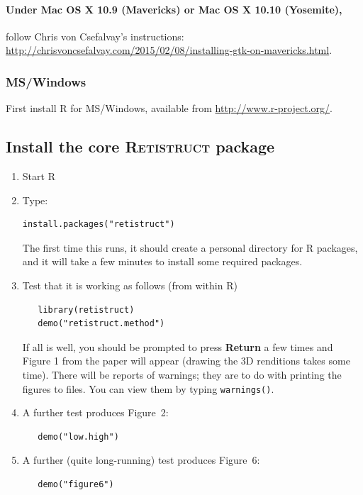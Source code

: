 \documentclass{article}
\begin{document}
\paragraph{Under Mac OS X 10.9 (Mavericks) or Mac OS X 10.10
  (Yosemite),}
follow Chris von Csefalvay's instructions:
\href{http://chrisvoncsefalvay.com/2015/02/08/installing-gtk-on-mavericks.html}{http://chrisvoncsefalvay.com/2015/02/08/installing-gtk-on-mavericks.html}.

\subsubsection{MS/Windows}

First install R for MS/Windows, available from \url{http://www.r-project.org/}.

\subsection{Install the core \textsc{Retistruct} package}

\begin{enumerate}
\item Start \textsc{R}
 \item  Type:
\begin{verbatim}
install.packages("retistruct")
\end{verbatim}
   The first time this runs, it should create a personal directory for
   R packages, and it will take a few minutes to install some required
   packages.
 \item Test that it is working as follows (from within R)
\begin{verbatim}
   library(retistruct)
   demo("retistruct.method")
\end{verbatim}
   If all is well, you should be prompted to press \textbf{Return} a
   few times and Figure 1 from the paper \cite{SterrattEtal2012} will
   appear (drawing the 3D renditions takes some time). There will be
   reports of warnings; they are to do with printing the figures to
   files. You can view them by typing \texttt{warnings()}.
 \item A further test produces Figure~2:
\begin{verbatim}
   demo("low.high")
\end{verbatim}
 \item A further (quite long-running) test produces Figure~6:
\begin{verbatim}
   demo("figure6")
\end{verbatim}
\end{enumerate}
\end{document}
